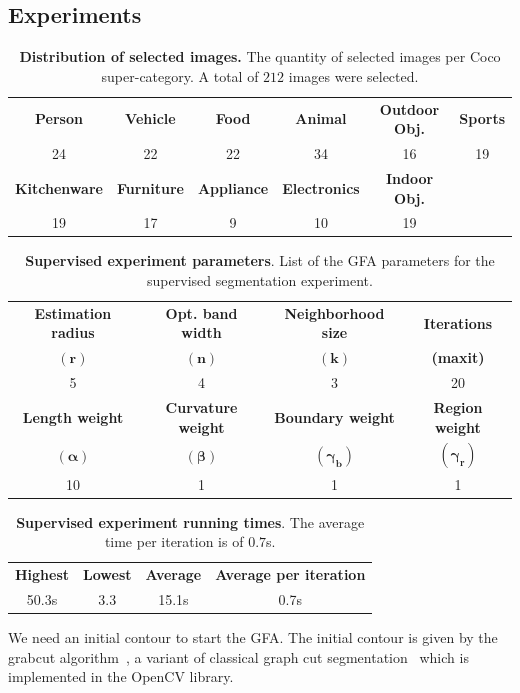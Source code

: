\documentclass{siamart220329}
\begin{document}
\subsection{Experiments}
%
%
\begin{table}[h!]
\footnotesize
    \caption{\textbf{Distribution of selected images.} The quantity of selected
    images per Coco super-category. A total of $212$ images were
    selected.}\label{tab:image-categories-distribution}
\begin{tabular}{cccccc}
\textbf{Person} & \textbf{Vehicle} & \textbf{Food} & \textbf{Animal} & \textbf{Outdoor Obj.} & \textbf{Sports} \\
24 & 22 & 22 & 34 & 16 & 19 \\[1em]
\textbf{Kitchenware} & \textbf{Furniture} & \textbf{Appliance} & \textbf{Electronics} & \textbf{Indoor Obj.} & \\
19 & 17 & 9 & 10 & 19 &
\end{tabular}
\end{table}
%
%
\begin{table}[h!]
\center
\footnotesize
\caption{\textbf{Supervised experiment parameters}. List of the GFA
parameters for the supervised segmentation
experiment.}
\label{tab:coco-experiment-parameter}
\begin{tabular}{cccc}
\textbf{Estimation radius} & \textbf{Opt. band width} & \textbf{Neighborhood size} & \textbf{Iterations} \\
$\mathbf{(r)}$ & $\mathbf{(n)}$ & $\mathbf{(k)}$ & \textbf{(maxit)}\\
5 & 4 & 3 & 20\\[1em]
\textbf{Length weight} & \textbf{Curvature weight} & \textbf{Boundary weight} & \textbf{Region weight}\\
$\boldsymbol{(\alpha)}$ & $\boldsymbol{(\beta)}$ & $\boldsymbol{(\gamma_b)}$ & $\boldsymbol{(\gamma_r)}$\\
10 & 1 & 1 & 1
\end{tabular}
\end{table}
%
%
\begin{table}[h!]
\footnotesize
\caption{\textbf{Supervised experiment running times}. The average time per
iteration is of $0.7$s.}
\label{tab:coco-experiment-running-time}
\center
\begin{tabular}{cccc}
\textbf{Highest} & \textbf{Lowest} & \textbf{Average} & \textbf{Average per iteration} \\
50.3s & 3.3 & 15.1s & 0.7s\\
\end{tabular}
\end{table}
%
%
We need an initial contour to start the GFA. The initial contour is given by the
grabcut algorithm~\cite{rother04grabcut}, a variant of classical graph cut
segmentation~\cite{boykov01graphcut} which is implemented in the OpenCV library.
\end{document}
